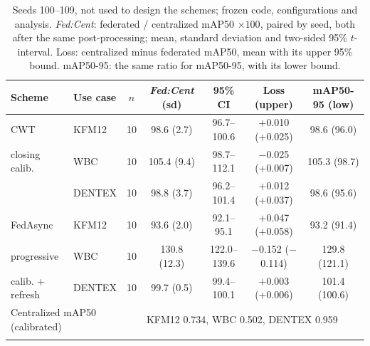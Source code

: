 \documentclass[pdflatex,sn-mathphys-num]{sn-jnl}
\newcommand{\fedcent}{\textit{Fed:Cent}}
\begin{document}
\begin{table}[t]
\caption{Seeds 100--109, not used to design the schemes; frozen code, configurations and analysis. \fedcent{}: federated / centralized mAP50 $\times100$, paired by seed, both after the same post-processing; mean, standard deviation and two-sided 95\% $t$-interval. Loss: centralized minus federated mAP50, mean with its upper 95\% bound. mAP50-95: the same ratio for mAP50-95, with its lower bound.}\label{tab:confirm}
\footnotesize
\setlength{\tabcolsep}{3pt}
\begin{tabular*}{\textwidth}{@{\extracolsep\fill}llccccc}
\toprule
Scheme & Use case & $n$ & \fedcent{} (sd) & 95\% CI & Loss (upper) & mAP50-95 (low) \\
\midrule
CWT & KFM12 & 10 & 98.6 (2.7) & 96.7--100.6 & +0.010 (+0.025) & 98.6 (96.0) \\
closing calib. & WBC & 10 & 105.4 (9.4) & 98.7--112.1 & $-$0.025 (+0.007) & 105.3 (98.7) \\
 & DENTEX & 10 & 98.8 (3.7) & 96.2--101.4 & +0.012 (+0.037) & 98.6 (95.6) \\
\midrule
FedAsync & KFM12 & 10 & 93.6 (2.0) & 92.1--95.1 & +0.047 (+0.058) & 93.2 (91.4) \\
progressive & WBC & 10 & 130.8 (12.3) & 122.0--139.6 & $-$0.152 ($-$0.114) & 129.8 (121.1) \\
calib. + refresh & DENTEX & 10 & 99.7 (0.5) & 99.4--100.1 & +0.003 (+0.006) & 101.4 (100.6) \\
\midrule
\multicolumn{3}{l}{Centralized mAP50 (calibrated)} & \multicolumn{4}{l}{KFM12 0.734, WBC 0.502, DENTEX 0.959} \\
\botrule
\end{tabular*}
\end{table}
\end{document}
